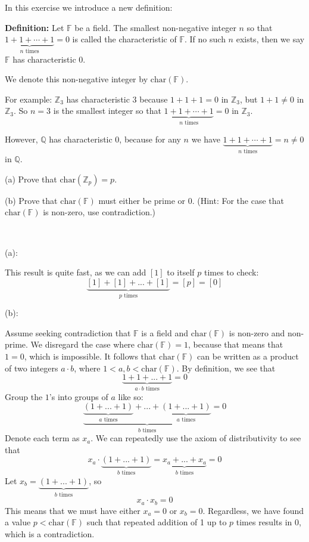 \documentclass{article}
\theoremstyle{plain} %
\numberwithin{thm}{section} %
\theoremstyle{definition}
\begin{document}
    \newpage
    \begin{question}{6}
        In this exercise we introduce a new definition:

        \textbf{Definition:} Let \(\mathbb{F}\) be a field. The smallest non-negative integer \(n\) so that 
        \(\underbrace{1 + 1 + \cdots + 1}_{n \text{ times}} = 0\)
        is called the characteristic of \(\mathbb{F}\). If no such \(n\) exists, then we say \(\mathbb{F}\) has characteristic 0.

        We denote this non-negative integer by \(\text{char}(\mathbb{F})\).

        For example: \(\mathbb{Z}_3\) has characteristic 3 because \(1 + 1 + 1 = 0\) in \(\mathbb{Z}_3\), but \(1 + 1 \neq 0\) in \(\mathbb{Z}_3\).
        So \(n = 3\) is the smallest integer so that 
        \(\underbrace{1 + 1 + \cdots + 1}_{n \text{ times}} = 0\)
        in \(\mathbb{Z}_3\).

        However, \(\mathbb{Q}\) has characteristic 0, because for any \(n\) we have 
        \(\underbrace{1 + 1 + \cdots + 1}_{n \text{ times}} = n \neq 0\)
        in \(\mathbb{Q}\).

        (a) Prove that \(\text{char}(\mathbb{Z}_p) = p\).

        (b) Prove that \(\text{char}(\mathbb{F})\) must either be prime or 0. (Hint: For the case that \(\text{char}(\mathbb{F})\) is non-zero, use contradiction.)

        \tcblower
        \ 

        (a):

        This result is quite fast, as we can add \([1]\) to itself \(p\) times to check:
        \[
            \underbrace{[1] + [1] + ... + [1]}_{p \text{ times}} = [p] = [0]
        \]

        \medskip

        (b):

        Assume seeking contradiction that \(\mathbb{F}\) is a field and \(\mathrm{char} (\mathbb{F})\) is non-zero and non-prime. We disregard the case where \(\mathrm{char} (\mathbb{F}) = 1\), because that means that \(1 = 0\), which is impossible. It follows that \(\mathrm{char} (\mathbb{F})\) can be written as a product of two integers \(a \cdot b\), where \(1 < a,b < \mathrm{char} (\mathbb{F})\). By definition, we see that
        \[
            \underbrace{1 + 1 + ... + 1}_{a\cdot b \text{ times}} = 0
        \]
        Group the \(1\)'s into groups of \(a\) like so:
        \[
            \underbrace{\underbrace{(1 + ... + 1)}_{a \text{ times}} + ... + \underbrace{(1 + ... + 1)}_{a \text{ times}}}_{b \text{ times}} = 0
        \]
        Denote each term as \(x_a\). We can repeatedly use the axiom of distributivity to see that
        \[
            x_a \cdot \underbrace{(1 + ... + 1)}_{b \text{ times}} = \underbrace{x_a + ... + x_a}_{b \text{ times}} = 0
        \]
        Let \(x_b = \underbrace{(1 + ... + 1)}_{b \text{ times}}\), so
        \[
            x_a \cdot x_b = 0
        \]
        This means that we must have either \(x_a = 0\) or \(x_b = 0\). Regardless, we have found a value \(p < \mathrm{char} (\mathbb{F})\) such that repeated addition of 1 up to \(p\) times results in 0, which is a contradiction.
    \end{question}
\end{document}
